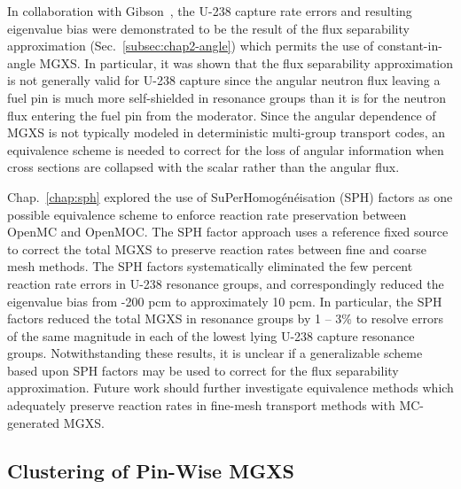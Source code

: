 In collaboration with Gibson~\cite{gibson2016thesis}, the U-238 capture rate errors and resulting eigenvalue bias were demonstrated to be the result of the flux separability approximation (Sec.~\ref{subsec:chap2-angle}) which permits the use of constant-in-angle \ac{MGXS}. In particular, it was shown that the flux separability approximation is not generally valid for U-238 capture since the angular neutron flux leaving a fuel pin is much more self-shielded in resonance groups than it is for the neutron flux entering the fuel pin from the moderator. Since the angular dependence of \ac{MGXS} is not typically modeled in deterministic multi-group transport codes, an equivalence scheme is needed to correct for the loss of angular information when cross sections are collapsed with the scalar rather than the angular flux. 

Chap.~\ref{chap:sph} explored the use of SuPerHomog\'{e}n\'{e}isation (SPH) factors as one possible equivalence scheme to enforce reaction rate preservation between OpenMC and OpenMOC. The \ac{SPH} factor approach uses a reference fixed source to correct the total \ac{MGXS} to preserve reaction rates between fine and coarse mesh methods. The \ac{SPH} factors systematically eliminated the few percent reaction rate errors in U-238 resonance groups, and correspondingly reduced the eigenvalue bias from -200 \ac{pcm} to approximately 10 \ac{pcm}. In particular, the \ac{SPH} factors reduced the total \ac{MGXS} in resonance groups by 1 -- 3\% to resolve errors of the same magnitude in each of the lowest lying U-238 capture resonance groups. Notwithstanding these results, it is unclear if a generalizable scheme based upon \ac{SPH} factors may be used to correct for the flux separability approximation. Future work should further investigate equivalence methods which adequately preserve reaction rates in fine-mesh transport methods with \ac{MC}-generated \ac{MGXS}.


\subsection{Clustering of Pin-Wise MGXS}
\label{subsec:chap12-mgxs-clustering}

